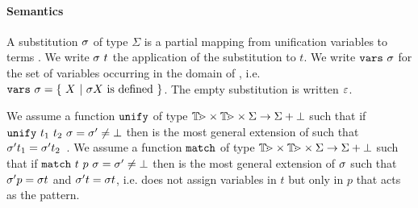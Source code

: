 \documentclass{these-ISSS}
\begin{document}
\newcommand{\rulePiM}[1]{
  \begin{myRule}{#1}
    \AxiomC{\ensuremath{y \# \prog \quad \runCmdR{\ConsHdNP{\goalCmd{(y + \prog)}{g[x/y]}{\alts}}\ConsTlNP{\vecL{g}}}{\alts[']}{\subst}}}
    \RightLabelM{\rulePi}
    \UnaryInfC{\ensuremath{\runCmdR{\ConsHdNP{\goalCmd{\prog}{(\piCmd{x}{g})}{\alts}}\ConsTlNP{\vecL{g}}}{\alts[']}{\subst}}}
  \end{myRule}
}



\newcommand{\unifyCmd}[5][]{\ensuremath{
  \ifstrequal{#1}{1}
    {\vecL{\unify\ #2\ #3}}
    {\unify\ #2\ #3}\ #4 = #5}}
\newcommand{\matchCmd}[5][]{\ensuremath{
  \ifstrequal{#1}{1}
  {\vecL{\match\ #2\ #3}}
  {\match\ #2\ #3}\ #4 = #5}}

\paragraph{Semantics}

A substitution $\subst$ of type $\Sigma$
is a partial mapping from unification variables
\VAR to terms \TERM{}. %
We write
$\subst\ t$ the  application of the substitution to $t$.
We write $\dom\ \subst$ for the set of variables occurring
in the domain %
of \subst, i.e.
$\dom\ \subst = \{\ X\ |\ \subst X \mathrm{\ is\ defined\ }\}$. %
The empty substitution is written $\EmptySubst$. %

We assume a function $\unify$ of type $\TERM \times \TERM \times \Sigma \to \Sigma + \bot$
such that if $\unifyCmd{t_1}{t_2}{\subst}{\subst[']} \not= \bot$ 
then \subst['] is the most general extension of \subst 
such that $\subst['] t_1 = \subst['] t_2$~\cite{miller92jsc}.
We assume a function $\match$ of type $\TERM \times \TERM \times \Sigma \to \Sigma + \bot$
such that if $\matchCmd{t}{p}{\subst}{\subst[']} \not= \bot$
then \subst[']  is the most general extension of  $\subst$
such that $\subst['] p = \subst t$ and $\subst[']t = \subst t$,
i.e. \match{} does not assign variables in $t$ but only in $p$ that acts as the pattern.
\end{document}
